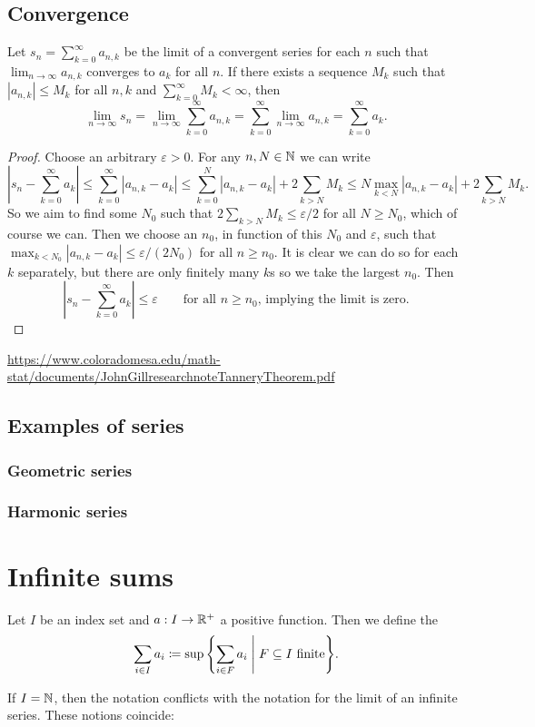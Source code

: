 \subsection{Convergence}
\begin{theorem} \label{tannery}
Let $s_n = \sum_{k=0}^\infty a_{n,k}$ be the limit of a convergent series for each $n$ such that $\lim_{n\to \infty}a_{n,k}$ converges to $a_k$ for all $n$. If there exists a sequence $M_k$ such that $|a_{n,k}|\leq M_k$ for all $n,k$ and $\sum_{k=0}^\infty M_k<\infty$, then
\[ \lim_{n\to\infty} s_n = \lim_{n\to\infty}\sum_{k=0}^\infty a_{n,k} = \sum_{k=0}^\infty\lim_{n\to\infty} a_{n,k} = \sum_{k=0}^\infty a_k.   \]
\end{theorem}
\begin{proof}
Choose an arbitrary $\varepsilon>0$. For any $n,N\in\mathbb{N}$ we can write
\[ \left|s_n - \sum_{k=0}^\infty a_k\right| \leq \sum_{k=0}^\infty\left|a_{n,k} -  a_k\right|\leq \sum_{k=0}^N\left|a_{n,k} -  a_k\right| + 2\sum_{k>N}M_k \leq N\max_{k<N}\left|a_{n,k} -  a_k\right| + 2\sum_{k>N}M_k. \]
So we aim to find some $N_0$ such that $2\sum_{k>N}M_k \leq \varepsilon/2$ for all $N\geq N_0$, which of course we can. Then we choose an $n_0$, in function of this $N_0$ and $\varepsilon$, such that $\max_{k<N_0}\left|a_{n,k} -  a_k\right|\leq \varepsilon/(2N_0)$ for all $n\geq n_0$. It is clear we can do so for each $k$ separately, but there are only finitely many $k$s so we take the largest $n_0$. Then
\[ \left|s_n - \sum_{k=0}^\infty a_k\right| \leq \varepsilon \qquad \text{for all $n\geq n_0$, implying the limit is zero.} \]
\end{proof}
\url{https://www.coloradomesa.edu/math-stat/documents/JohnGillresearchnoteTanneryTheorem.pdf}



\subsection{Examples of series}
\subsubsection{Geometric series}
\subsubsection{Harmonic series}

\section{Infinite sums}
\begin{definition}
Let $I$ be an index set and $a: I\to \mathbb{R}^+$ a positive function. Then we define the 
\[ \sum_{i\in I}a_i \defeq \sup\setbuilder{\sum_{i\in F}a_i}{\text{$F\subseteq I$ finite}}. \]
\end{definition}
If $I = \mathbb{N}$, then the notation conflicts with the notation for the limit of an infinite series. These notions coincide:

